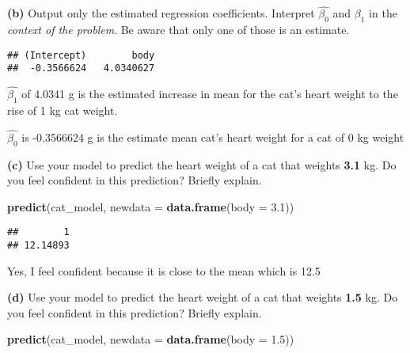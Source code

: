 \documentclass[]{article}
\newenvironment{Shaded}{\begin{snugshade}}{\end{snugshade}}
\newcommand{\DataTypeTok}[1]{\textcolor[rgb]{0.13,0.29,0.53}{#1}}
\newcommand{\FloatTok}[1]{\textcolor[rgb]{0.00,0.00,0.81}{#1}}
\newcommand{\KeywordTok}[1]{\textcolor[rgb]{0.13,0.29,0.53}{\textbf{#1}}}
\newcommand{\NormalTok}[1]{#1}
\newcommand{\OperatorTok}[1]{\textcolor[rgb]{0.81,0.36,0.00}{\textbf{#1}}}
\begin{document}
\textbf{(b)} Output only the estimated regression coefficients.
Interpret \(\hat{\beta_0}\) and \(\beta_1\) in the \emph{context of the
problem}. Be aware that only one of those is an estimate.

\begin{Shaded}
\end{Shaded}

\begin{verbatim}
## (Intercept)        body 
##  -0.3566624   4.0340627
\end{verbatim}

\(\hat{\beta_1}\) of 4.0341 g is the estimated increase in mean for the
cat's heart weight to the rise of 1 kg cat weight.

\(\hat{\beta_0}\) is -0.3566624 g is the estimate mean cat's heart
weight for a cat of 0 kg weight

\textbf{(c)} Use your model to predict the heart weight of a cat that
weights \textbf{3.1} kg. Do you feel confident in this prediction?
Briefly explain.

\begin{Shaded}
\begin{Highlighting}[]
\KeywordTok{predict}\NormalTok{(cat_model, }\DataTypeTok{newdata =} \KeywordTok{data.frame}\NormalTok{(}\DataTypeTok{body =} \FloatTok{3.1}\NormalTok{))}
\end{Highlighting}
\end{Shaded}

\begin{verbatim}
##        1 
## 12.14893
\end{verbatim}

Yes, I feel confident because it is close to the mean which is 12.5

\textbf{(d)} Use your model to predict the heart weight of a cat that
weights \textbf{1.5} kg. Do you feel confident in this prediction?
Briefly explain.

\begin{Shaded}
\begin{Highlighting}[]
\KeywordTok{predict}\NormalTok{(cat_model, }\DataTypeTok{newdata =} \KeywordTok{data.frame}\NormalTok{(}\DataTypeTok{body =} \FloatTok{1.5}\NormalTok{))}
\end{Highlighting}
\end{Shaded}
\end{document}
